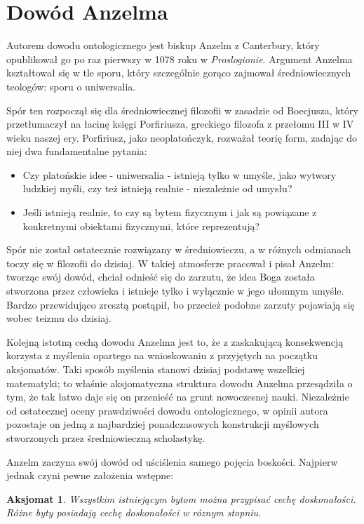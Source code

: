 \documentclass{article}
\newtheorem{axiom}{Aksjomat}
\begin{document}
\section{Dowód Anzelma} \label{sec:anzelm}

Autorem dowodu ontologicznego jest biskup Anzelm z Canterbury, który opublikował go po raz pierwszy w 1078 roku w \emph{Proslogionie}. Argument Anzelma kształtował się w tle sporu, który szczególnie gorąco zajmował średniowiecznych teologów: sporu o uniwersalia. 

Spór ten rozpoczął się dla średniowiecznej filozofii w zasadzie od Boecjusza, który przetłumaczył na łacinę księgi Porfiriusza, greckiego filozofa z przełomu III w IV wieku naszej ery. Porfiriusz, jako neoplatończyk, rozważał teorię form, zadając do niej dwa fundamentalne pytania:
\begin{itemize}
	\item Czy platońskie idee - uniwersalia - istnieją tylko w umyśle, jako wytwory ludzkiej myśli, czy też istnieją realnie - niezależnie od umysłu?
	\item Jeśli istnieją realnie, to czy są bytem fizycznym i jak są powiązane z konkretnymi obiektami fizycznymi, które reprezentują?
\end{itemize}

Spór nie został ostatecznie rozwiązany w średniowieczu, a w różnych odmianach toczy się w filozofii do dzisiaj. W takiej atmosferze pracował i pisał Anzelm: tworząc swój dowód, chciał odnieść się do zarzutu, że idea Boga została stworzona przez człowieka i istnieje tylko i wyłącznie w jego ułomnym umyśle. Bardzo przewidująco zresztą postąpił, bo przecież podobne zarzuty pojawiają się wobec teizmu do dzisiaj. 

Kolejną istotną cechą dowodu Anzelma jest to, że z zaskakującą konsekwencją korzysta z myślenia opartego na wnioskowaniu z przyjętych na początku aksjomatów. Taki sposób myślenia stanowi dzisiaj podstawę wszelkiej matematyki; to właśnie aksjomatyczna struktura dowodu Anzelma przesądziła o tym, że tak łatwo daje się on przenieść na grunt nowoczesnej nauki. Niezależnie od ostatecznej oceny prawdziwości dowodu ontologicznego, w opinii autora pozostaje on jedną z najbardziej ponadczasowych konstrukcji myślowych stworzonych przez średniowieczną scholastykę. 

Anzelm zaczyna swój dowód od uściślenia samego pojęcia boskości. Najpierw jednak czyni pewne założenia wstępne: 

\begin{axiom} \label{axiom:1}
	Wszystkim istniejącym bytom można przypisać cechę \emph{doskonałości}. Różne byty posiadają cechę doskonałości w róznym stopniu. 
\end{axiom}
\end{document}
